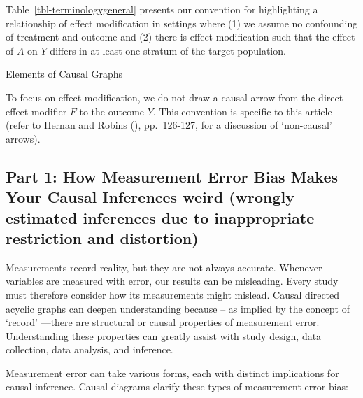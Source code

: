 \documentclass[
  single column]{article}
\begin{document}
Table~\ref{tbl-terminologygeneral} presents our convention for
highlighting a relationship of effect modification in settings where (1)
we assume no confounding of treatment and outcome and (2) there is
effect modification such that the effect of \(A\) on \(Y\) differs in at
least one stratum of the target population.

\begin{table}

\caption{\label{tbl-terminologygeneral}Elements of Causal Graphs}

\centering{

\terminologyeffectmodification

}

\end{table}%

To focus on effect modification, we do not draw a causal arrow from the
direct effect modifier \(F\) to the outcome \(Y\). This convention is
specific to this article (refer to Hernan and Robins
(), pp.~126-127, for a discussion
of `non-causal' arrows).

\subsection{\texorpdfstring{Part 1: How Measurement Error Bias Makes
Your Causal Inferences \textbf{weird} (\textbf{w}rongly
\textbf{e}stimated inferences due to \textbf{i}nappropriate
\textbf{r}estriction and
\textbf{d}istortion)}{Part 1: How Measurement Error Bias Makes Your Causal Inferences weird (wrongly estimated inferences due to inappropriate restriction and distortion)}}\label{id-sec-1}

Measurements record reality, but they are not always accurate. Whenever
variables are measured with error, our results can be misleading. Every
study must therefore consider how its measurements might mislead. Causal
directed acyclic graphs can deepen understanding because -- as implied
by the concept of `record' ---there are structural or causal properties
of measurement error. Understanding these properties can greatly assist
with study design, data collection, data analysis, and inference.

Measurement error can take various forms, each with distinct
implications for causal inference. Causal diagrams clarify these types
of measurement error bias:
\end{document}
